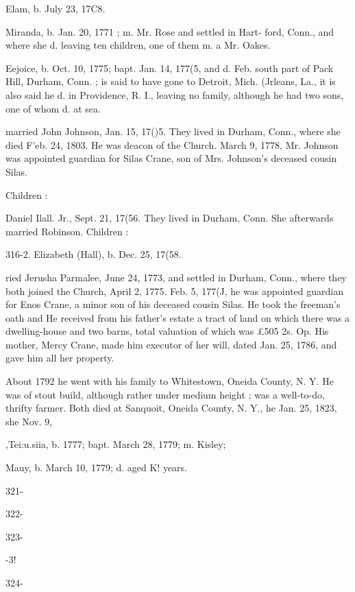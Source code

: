 \documentclass{book}
\begin{document}
Elam, b. July 23, 17C8. 

Miranda, b. Jan. 20, 1771 ; m. Mr. Rose and settled in Hart- 
ford, Conn., and where she d. leaving ten children, one of 
them m. a Mr. Oakes. 


Eejoice, b. Oct. 10, 1775; bapt. Jan. 14, 177(5, and d. Feb. 
south part of Pack Hill, Durham, Conn. ; is said to have 
gone to Detroit, Mich. 
(Jrleans, La., it is also said he d. in Providence, R. I., 
leaving no family, although he had two sons, one of whom 
d. at sea. 

married John Johnson, Jan. 15, 17()5. They lived in Durham, 
Conn., where she died F'eb. 24, 1803. He was deacon of the 
Church. March 9, 1778, Mr. Johnson was appointed guardian 
for Silas Crane, son of Mrs. Johnson's deceased cousin Silas. 

Children : 


Daniel Ilall. Jr., Sept. 21, 17(56. They lived in Durham, Conn. 
She afterwards married Robinson. Children : 


316-2. Elizabeth (Hall), b. Dec. 25, 17(58. 




ried Jerusha Parmalee, June 24, 1773, and settled in Durham, 
Conn., where they both joined the Church, April 2, 1775. Feb. 
5, 177(J, he was appointed guardian for Enos Crane, a minor son 
of his deceased cousin Silas. He took the freeman's oath and 
He received from his father's estate a tract of land on which there 
was a dwelling-house and two barns, total valuation of which was 
£505  2s.  Op. His mother, Mercy Crane, made him executor 
of her will, dated Jan. 25, 1786, and gave him all her property. 




About 1792 he went with his family to Whitestown, Oneida 
County, N. Y. He was of stout build, although rather under 
medium height ; was a well-to-do, thrifty farmer. Both died at 
Sanquoit, Oneida County, N. Y., he Jan. 25, 1823, she Nov. 9, 


,Tei:u.siia, b. 1777; bapt. March 28, 1779; m. Kisley; 

Mauy, b. March 10, 1779; d. aged K! years. 



321- 




322- 




323- 


-3! 


324- 
\end{document}
